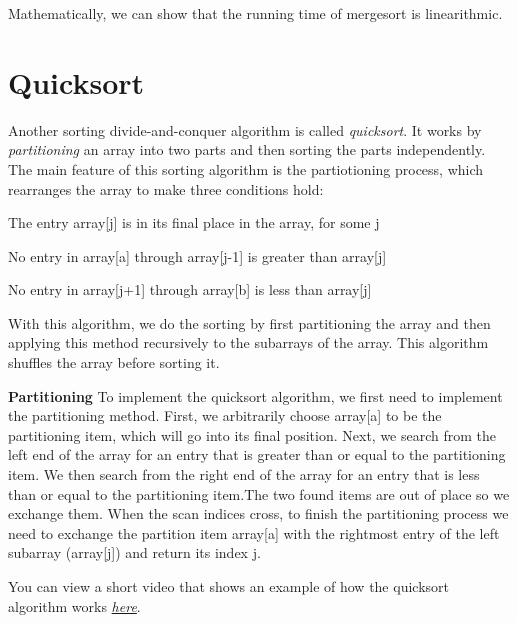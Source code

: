  Mathematically, we can show that the running time of mergesort is linearithmic.
 
 
 \section{Quicksort}
 
 
 Another sorting divide-and-conquer algorithm is called \textit{quicksort}. It works by \textit{partitioning} an array into two parts and then sorting the parts independently. The main feature of this sorting algorithm is the partiotioning process, which rearranges the array to make three conditions hold:

\begin{itemsize}
\item The entry array[j] is in its final place in the array, for some j
\item No entry in array[a] through array[j-1] is greater than array[j]
\item No entry in array[j+1] through array[b] is less than array[j]
\end{itemsize}

With this algorithm, we do the sorting by first partitioning the array and then applying this method recursively to the subarrays of the array. This algorithm shuffles the array before sorting it. 

\textbf{Partitioning} To implement the quicksort algorithm, we first need to implement the partitioning method. First, we arbitrarily choose array[a] to be the partitioning item, which will go into its final position. Next, we search from the left end of the array for an entry that is greater than or equal to the partitioning item. We then search from the right end of the array for an entry that is less than or equal to the partitioning item.The two found items are out of place so we exchange them. When the scan indices cross, to finish the partitioning process we need to exchange the partition item array[a] with the rightmost entry of the left subarray (array[j]) and return its index j.



You can view a short video that shows an example of how the quicksort algorithm works \href{https://youtu.be/Hoixgm4-P4M}{\textit{here}}.

